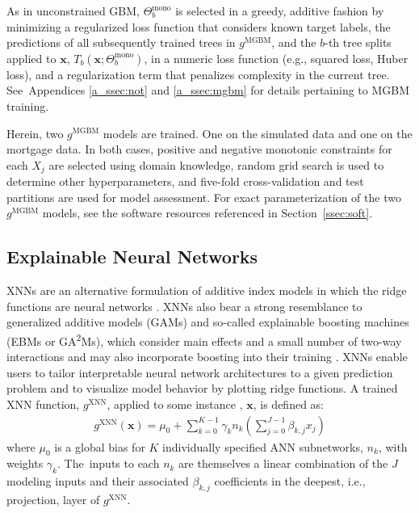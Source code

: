 \documentclass[information,article,accept,moreauthors,pdftex]{Definitions/mdpi}
\begin{document}
{{ As in unconstrained GBM, $\Theta^{\text{mono}}_b$ is selected in a greedy, additive fashion by minimizing a regularized loss function that considers known target labels, the predictions of all subsequently trained trees in $g^{\text{MGBM}}$, and the $b$-th tree splits applied to $\mathbf{x}$, $T_b(\mathbf{x};\Theta^\text{mono}_b)$, in a numeric loss function (e.g., squared loss, Huber loss), and a regularization term that penalizes complexity in the current tree. See~Appendices \ref{a_ssec:not} and \ref{a_ssec:mgbm} for details pertaining to MGBM training.

Herein, two $g^\text{MGBM}$ models are trained. One on the simulated data and one on the mortgage data. In both cases, positive and negative monotonic constraints for each $X_j$ are selected using domain knowledge, random grid search is used to determine other hyperparameters, and five-fold cross-validation and test partitions are used for model assessment. For exact parameterization of the two $g^\text{MGBM}$ models, see the software resources referenced in Section~\ref{ssec:soft}. 

\subsection{Explainable Neural Networks}\label{ssec:xnn}

XNNs are an alternative formulation of additive index models in which the ridge functions are neural networks \cite{wf_xnn}. XNNs also bear a strong resemblance to generalized additive models (GAMs) and so-called explainable boosting machines (EBMs or GA\textsuperscript{2}Ms), which consider main effects and a small number of two-way interactions and may also incorporate boosting into their training \cite{esl,ga2m}. XNNs enable users to tailor interpretable neural network architectures to a given prediction problem and to visualize model behavior by plotting ridge functions. A trained XNN function, $g^{\text{XNN}}$, applied to some instance , $\mathbf{x}$, is defined as:
\begin{equation}
\begin{aligned}
\label{eq:xnn}
g^{\text{XNN}}(\mathbf{x}) = \mu_0 + \sum_{k=0}^{K-1}\gamma_k n_k(\sum^{J-1}_{j=0}\beta_{k, j}x_j)
\end{aligned}
\end{equation}
where $\mu_0$ is a global bias for $K$ individually specified ANN subnetworks, $n_k$, with weights $\gamma_k$. The~inputs to each $n_k$ are themselves a linear combination of the $J$ modeling inputs and their associated $\beta_{k,j}$ coefficients in the deepest, i.e., {projection}, layer of $g^\text{XNN}$. 

}}
\end{document}
